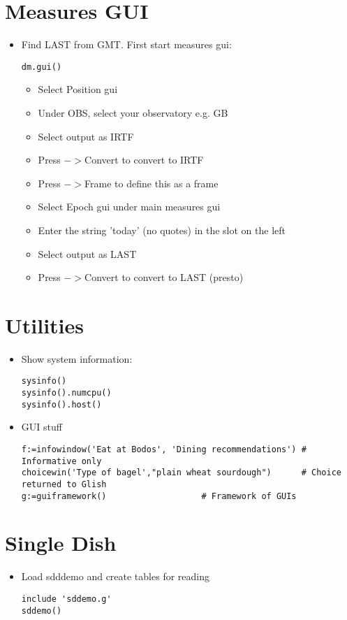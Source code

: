 \section{Measures GUI}

\begin{itemize}
\item Find LAST from GMT. First start measures gui:
\begin{verbatim}
dm.gui()
\end{verbatim}
\begin{itemize}
\item Select Position gui
\item Under OBS, select your observatory e.g. GB
\item Select output as IRTF
\item Press $->$Convert to convert to IRTF
\item Press $->$Frame to define this as a frame
\item Select Epoch gui under main measures gui
\item Enter the string 'today' (no quotes) in the slot on
the left
\item Select output as LAST
\item Press $->$Convert to convert to LAST (presto)
\end{itemize}
\end{itemize}

\section{Utilities}

\begin{itemize}
\item Show system information:
\begin{verbatim}
sysinfo()
sysinfo().numcpu()
sysinfo().host()
\end{verbatim}
\item GUI stuff
\begin{verbatim}
f:=infowindow('Eat at Bodos', 'Dining recommendations') # Informative only
choicewin('Type of bagel',"plain wheat sourdough")      # Choice returned to Glish
g:=guiframework()					# Framework of GUIs
\end{verbatim}
\end{itemize}

\section{Single Dish}

\begin{itemize}
\item Load sdddemo and create tables for reading
\begin{verbatim}
include 'sddemo.g'
sddemo()
\end{verbatim}
\end{itemize}
